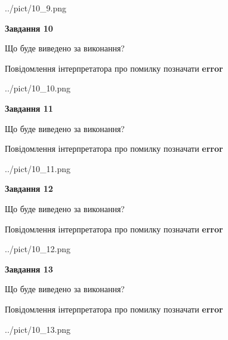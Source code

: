 \documentclass[11pt, ukrainian]{article}
\begin{document}
{\begin {large}
\begin{center}
	{../pict/10_9.png}
\end{center}
\newpage

{\begin {center}\textbf{Завдання 10}\end {center}}\par
Що буде виведено за виконання? \par
Повідомлення інтерпретатора про помилку позначати \textbf{error}

\begin{center}
	{../pict/10_10.png}
\end{center}
\newpage

{\begin {center}\textbf{Завдання 11}\end {center}}\par
Що буде виведено за виконання? \par
Повідомлення інтерпретатора про помилку позначати \textbf{error}

\begin{center}
	{../pict/10_11.png}
\end{center}
\newpage

{\begin {center}\textbf{Завдання 12}\end {center}}\par
Що буде виведено за виконання? \par
Повідомлення інтерпретатора про помилку позначати \textbf{error}

\begin{center}
	{../pict/10_12.png}
\end{center}
\newpage

{\begin {center}\textbf{Завдання 13}\end {center}}\par
Що буде виведено за виконання? \par
Повідомлення інтерпретатора про помилку позначати \textbf{error}

\begin{center}
	{../pict/10_13.png}
\end{center}
\newpage


\end{large}}
\end{document}
